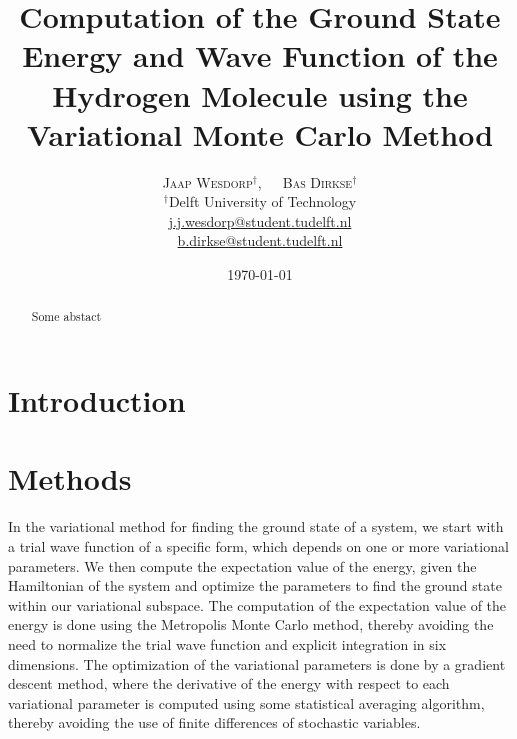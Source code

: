 \documentclass[twoside]{article}
\title{\vspace{-15mm}\fontsize{18pt}{10pt}\selectfont\textbf{Computation of the Ground State Energy and Wave Function of the Hydrogen Molecule using the Variational Monte Carlo Method}} %
\author{
	\large
	\textsc{Jaap Wesdorp}$^\dagger$, $\hspace{10pt}$ \textsc{Bas Dirkse}$^\dagger$ \\ %
	\normalsize $^\dagger$Delft University of Technology \\ %
	\normalsize \href{mailto:j.j.wesdorp@student.tudelft.nl}{j.j.wesdorp@student.tudelft.nl} \\
	\normalsize \href{mailto:b.dirkse@student.tudelft.nl}{b.dirkse@student.tudelft.nl} 
}
\date{\today\vspace{-8mm}}
\begin{document}


\maketitle %
\thispagestyle{firststyle} %


\begin{abstract}
\noindent  
Some abstact

	
\end{abstract}


\section{Introduction}



\section{Methods}
In the variational method for finding the ground state of a system, we start with a trial wave function of a specific form, which depends on one or more variational parameters. We then compute the expectation value of the energy, given the Hamiltonian of the system and optimize the parameters to find the ground state within our variational subspace. The computation of the expectation value of the energy is done using the Metropolis Monte Carlo method, thereby avoiding the need to normalize the trial wave function and explicit integration in six dimensions. The optimization of the variational parameters is done by a gradient descent method, where the derivative of the energy with respect to each variational parameter is computed using some statistical averaging algorithm, thereby avoiding the use of finite differences of stochastic variables. 
\end{document}
